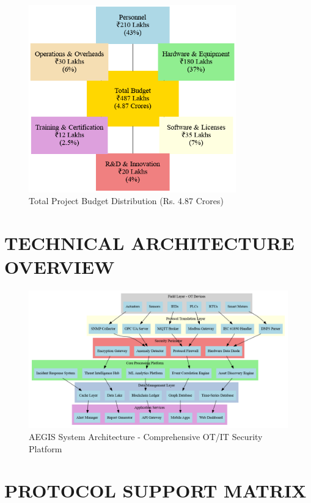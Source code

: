 \documentclass[12pt,a4paper]{article}
\begin{document}
\begin{figure}[H]
\centering
\includegraphics[width=0.8\textwidth]{diagrams/budget_distribution.png}
\caption{Total Project Budget Distribution (Rs. 4.87 Crores)}
\label{fig:budget_pie}
\end{figure}

\section{TECHNICAL ARCHITECTURE OVERVIEW}

\begin{figure}[H]
\centering
\includegraphics[width=\textwidth]{diagrams/aegis_architecture.png}
\caption{AEGIS System Architecture - Comprehensive OT/IT Security Platform}
\label{fig:architecture}
\end{figure}

\section{PROTOCOL SUPPORT MATRIX}
\end{document}
